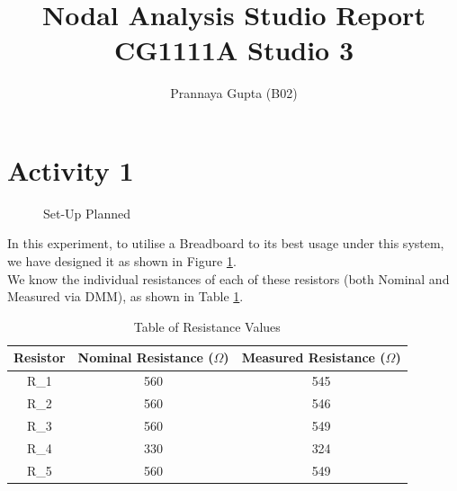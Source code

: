 \documentclass{article}
\title{\LARGE \textbf{Nodal Analysis} Studio Report \\ \Small CG1111A Studio 3}
\author{Prannaya Gupta (B02)}
\begin{document}
\maketitle

\section{Activity 1}

\begin{figure}[htbp]
\centering
{}\label{fig:setup}
\label{fig:breadboard}

\caption{Set-Up Planned} \label{fig:1}
\end{figure}

In this experiment, to utilise a Breadboard to its best usage under this system, we have designed it as shown in Figure \ref{fig:1}. \\

We know the individual resistances of each of these resistors (both Nominal and Measured via DMM), as shown in Table \ref{tab:resistances}.

\begin{table}[!h]
    \centering
    \begin{tabular}{|c|c|c|}
        \hline Resistor & Nominal Resistance ($\Omega$) & Measured Resistance ($\Omega$) \\
        \hline R_1 & 560 & 545 \\
        \hline R_2 & 560 & 546 \\
        \hline R_3 & 560 & 549 \\
        \hline R_4 & 330 & 324 \\
        \hline R_5 & 560 & 549 \\
        \hline
    \end{tabular}
    \caption{Table of Resistance Values}
    \label{tab:resistances}
\end{table}
\end{document}

